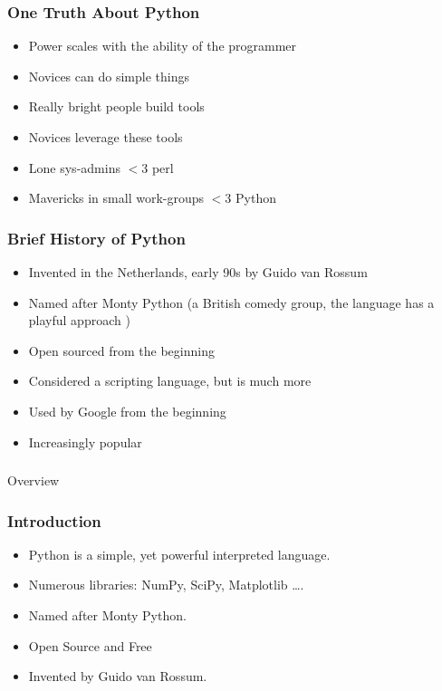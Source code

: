 \begin{frame}[fragile]\frametitle{One Truth About Python}
    \begin{itemize}
    \item Power scales with the ability of the programmer
    \item Novices can do simple things
    \item Really bright people build tools
    \item Novices leverage these tools
    \item Lone sys-admins $<$3 perl
    \item Mavericks in small work-groups $<$3 Python
    \end{itemize}
\end{frame}


\begin{frame}[fragile]\frametitle{Brief History of Python}
    \begin{itemize}
    \item Invented in the Netherlands, early 90s by Guido van Rossum
    \item Named after Monty Python (a British comedy group, the language has a playful approach )
    \item Open sourced from the beginning
    \item Considered a scripting language, but is much more
    \item Used by Google from the beginning
    \item Increasingly popular
    \end{itemize}
\end{frame}

\begin{frame}[fragile]\frametitle{}
\begin{center}
{\Large Overview}
\end{center}
\end{frame}



\begin{frame}[fragile]  \frametitle{Introduction}
\begin{itemize}
\item Python is a simple, yet powerful interpreted language.
\item  Numerous libraries: NumPy, SciPy, Matplotlib \ldots.
\item Named after Monty Python.
\item Open Source and Free
\item Invented by Guido van Rossum.
\end{itemize}
\end{frame}

